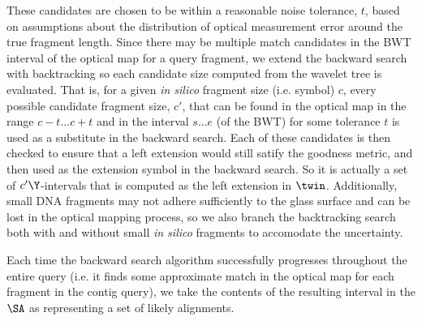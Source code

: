 \documentclass[doctor]{thesis}
\begin{document}
These candidates are chosen to be within a reasonable noise tolerance, $t$, based on assumptions about the distribution of optical measurement error around the true fragment length.
 Since there may be multiple match candidates in the BWT interval of the optical map for a query fragment, we extend the backward search with backtracking so each candidate size computed from the wavelet tree is evaluated.  That is, for a given {\em in silico} fragment size (i.e. symbol) $c$, every possible candidate fragment size, $c'$, that can be found in the optical map in the range $c - t \ldots c + t$ and in the interval $s \ldots e$ (of the BWT) for some tolerance $t$ is used as a substitute in the backward search. Each of these candidates is then checked to ensure that a left extension would still satify the goodness metric, and then used as the extension symbol in the backward search.  So it is actually a set of $c'\Y$-intervals that is computed as the left extension in $\twin$.  Additionally, small DNA fragments may not adhere sufficiently to the glass surface and can be lost in the optical mapping process, so we also branch the backtracking search both with and without small {\em in silico} fragments to accomodate the uncertainty.

Each time the backward search algorithm successfully progresses throughout the entire query (i.e. it finds some approximate match in the optical map for each fragment in the contig query), we take the contents of the resulting interval in the $\SA$ as representing a set of likely alignments.










\renewcommand{\algorithmiccomment}[1]{\hskip0em$\triangleright$ #1}
\end{document}
